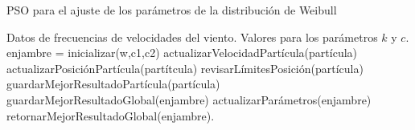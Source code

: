 \begin{algorithm}[h!]
\caption{PSO para el ajuste de los parámetros de la distribución de Weibull}
\label{alg:pso}
\begin{algorithmic}
\REQUIRE Datos de frecuencias de velocidades del viento.
\ENSURE Valores para los parámetros $k$ y $c$.
\STATE enjambre = inicializar(w,c1,c2)
    \STATE actualizarVelocidadPartícula(partícula)
    \STATE actualizarPosiciónPartícula(partítcula)
    \STATE revisarLímitesPosición(partícula)
    \STATE guardarMejorResultadoPartícula(partícula)
\ENDFOR
\STATE guardarMejorResultadoGlobal(enjambre)
\STATE actualizarParámetros(enjambre)
\ENDFOR
\STATE retornarMejorResultadoGlobal(enjambre).
\end{algorithmic}
\end{algorithm}